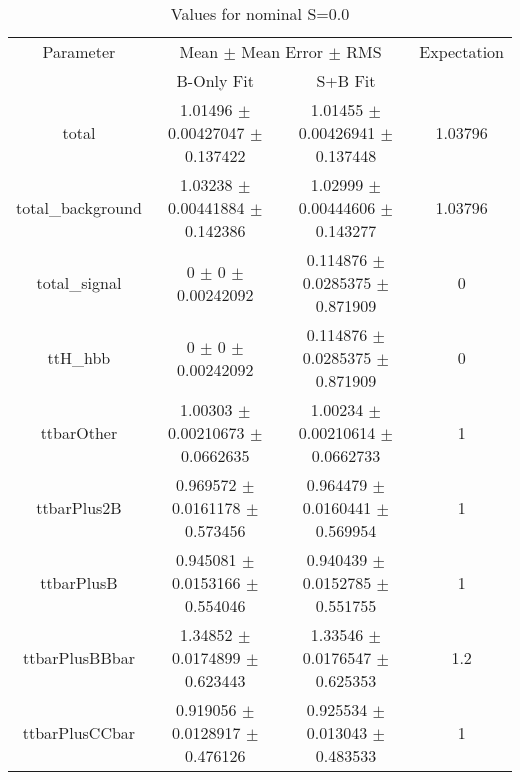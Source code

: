 \begin{table}
\centering
\caption{Values for nominal S=0.0}
\begin{tabular}{cccc}
\toprule
Parameter & \multicolumn{2}{c}{Mean $\pm$ Mean Error $\pm$ RMS} & Expectation\\
 & B-Only Fit & S+B Fit & \\
\midrule
total & \num{1.01496} $\pm$ \num{0.00427047} $\pm$ \num{0.137422} & \num{1.01455} $\pm$ \num{0.00426941} $\pm$ \num{0.137448} & \num{1.03796}\\
total\_background & \num{1.03238} $\pm$ \num{0.00441884} $\pm$ \num{0.142386} & \num{1.02999} $\pm$ \num{0.00444606} $\pm$ \num{0.143277} & \num{1.03796}\\
total\_signal & \num{0} $\pm$ \num{0} $\pm$ \num{0.00242092} & \num{0.114876} $\pm$ \num{0.0285375} $\pm$ \num{0.871909} & \num{0}\\
ttH\_hbb & \num{0} $\pm$ \num{0} $\pm$ \num{0.00242092} & \num{0.114876} $\pm$ \num{0.0285375} $\pm$ \num{0.871909} & \num{0}\\
ttbarOther & \num{1.00303} $\pm$ \num{0.00210673} $\pm$ \num{0.0662635} & \num{1.00234} $\pm$ \num{0.00210614} $\pm$ \num{0.0662733} & \num{1}\\
ttbarPlus2B & \num{0.969572} $\pm$ \num{0.0161178} $\pm$ \num{0.573456} & \num{0.964479} $\pm$ \num{0.0160441} $\pm$ \num{0.569954} & \num{1}\\
ttbarPlusB & \num{0.945081} $\pm$ \num{0.0153166} $\pm$ \num{0.554046} & \num{0.940439} $\pm$ \num{0.0152785} $\pm$ \num{0.551755} & \num{1}\\
ttbarPlusBBbar & \num{1.34852} $\pm$ \num{0.0174899} $\pm$ \num{0.623443} & \num{1.33546} $\pm$ \num{0.0176547} $\pm$ \num{0.625353} & \num{1.2}\\
ttbarPlusCCbar & \num{0.919056} $\pm$ \num{0.0128917} $\pm$ \num{0.476126} & \num{0.925534} $\pm$ \num{0.013043} $\pm$ \num{0.483533} & \num{1}\\
\bottomrule
\end{tabular}
\end{table}